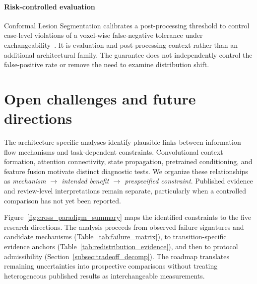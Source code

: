 \documentclass[5p,times,authoryear]{elsarticle}
\begin{document}
\paragraph{Risk-controlled evaluation}
Conformal Lesion Segmentation calibrates a post-processing threshold to control case-level violations of a voxel-wise false-negative tolerance under exchangeability~\citep{tan2026cls_context}. It is evaluation and post-processing context rather than an additional architectural family. The guarantee does not independently control the false-positive rate or remove the need to examine distribution shift.

\section{Open challenges and future directions}
\label{sec:unified_challenges}


The architecture-specific analyses identify plausible links between information-flow mechanisms and task-dependent constraints. Convolutional context formation, attention connectivity, state propagation, pretrained conditioning, and feature fusion motivate distinct diagnostic tests. We organize these relationships as \emph{mechanism $\rightarrow$ intended benefit $\rightarrow$ prespecified constraint}. Published evidence and review-level interpretations remain separate, particularly when a controlled comparison has not yet been reported.

Figure~\ref{fig:cross_paradigm_summary} maps the identified constraints to the five research directions. The analysis proceeds from observed failure signatures and candidate mechanisms (Table~\ref{tab:failure_matrix}), to transition-specific evidence anchors (Table~\ref{tab:redistribution_evidence}), and then to protocol admissibility (Section~\ref{subsec:tradeoff_decomp}). The roadmap translates remaining uncertainties into prospective comparisons without treating heterogeneous published results as interchangeable measurements.
\end{document}
